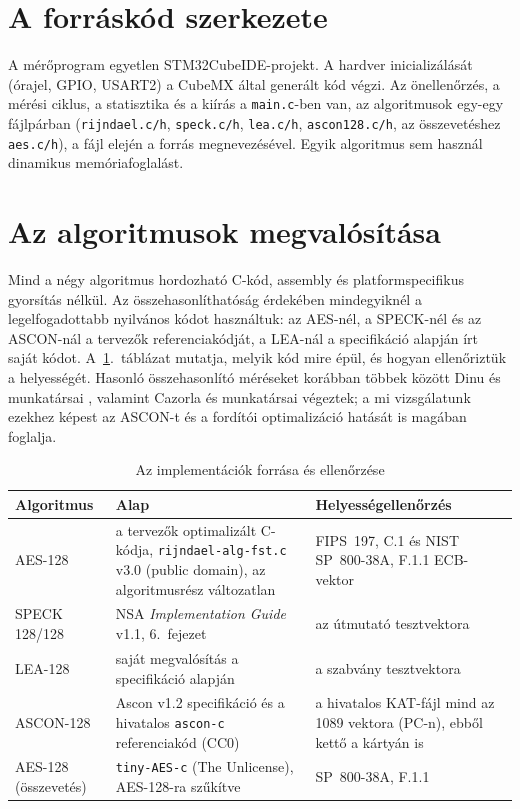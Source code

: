 \documentclass[a4paper,12pt]{report}
\theoremstyle{definition}
\theoremstyle{remark}
\begin{document}
\section{A forráskód szerkezete}

A mérőprogram egyetlen STM32CubeIDE-projekt. A hardver inicializálását (órajel, GPIO, USART2) a CubeMX által generált kód végzi. Az önellenőrzés, a mérési ciklus, a statisztika és a kiírás a \texttt{main.c}-ben van, az algoritmusok egy-egy fájlpárban (\texttt{rijndael.c/h}, \texttt{speck.c/h}, \texttt{lea.c/h}, \texttt{ascon128.c/h}, az összevetéshez \texttt{aes.c/h}), a fájl elején a forrás megnevezésével. Egyik algoritmus sem használ dinamikus memóriafoglalást.

\section{Az algoritmusok megvalósítása}\label{sec:megvalositas}

Mind a négy algoritmus hordozható C-kód, assembly és platformspecifikus gyorsítás nélkül. Az összehasonlíthatóság érdekében mindegyiknél a legelfogadottabb nyilvános kódot használtuk: az AES-nél, a SPECK-nél és az ASCON-nál a tervezők referenciakódját, a LEA-nál a specifikáció alapján írt saját kódot. A~\ref{tab:forrasok}.~táblázat mutatja, melyik kód mire épül, és hogyan ellenőriztük a helyességét. Hasonló összehasonlító méréseket korábban többek között Dinu és munkatársai \cite{Dinu2015}, valamint Cazorla és munkatársai \cite{Cazorla2013} végeztek; a mi vizsgálatunk ezekhez képest az ASCON-t és a fordítói optimalizáció hatását is magában foglalja.

\begin{table}[htbp]
    \centering
    \small
    \caption{Az implementációk forrása és ellenőrzése}
    \label{tab:forrasok}
    \begin{tabularx}{\textwidth}{|l|X|X|}
        \hline
        \textbf{Algoritmus} & \textbf{Alap} & \textbf{Helyességellenőrzés} \\ \hline
        AES-128 & a tervezők optimalizált C-kódja, \texttt{rijndael-alg-fst.c} v3.0 \cite{RijndaelFst} (public domain), az algoritmusrész változatlan & FIPS~197, C.1 \cite{FIPS197} és NIST SP~800-38A, F.1.1 ECB-vektor \cite{SP80038A} \\ \hline
        SPECK 128/128 & NSA \emph{Implementation Guide} v1.1, 6.~fejezet \cite{Beaulieu2019} & az útmutató tesztvektora \\ \hline
        LEA-128 & saját megvalósítás a specifikáció alapján \cite{Hong2013,Lee2014} & a szabvány tesztvektora \cite{KISALEA} \\ \hline
        ASCON-128 & Ascon v1.2 specifikáció \cite{Dobraunig2021} és a hivatalos \texttt{ascon-c} referenciakód \cite{AsconC} (CC0) & a hivatalos KAT-fájl mind az 1089 vektora (PC-n), ebből kettő a kártyán is \\ \hline
        AES-128 (összevetés) & \texttt{tiny-AES-c} \cite{TinyAES} (The Unlicense), AES-128-ra szűkítve & SP~800-38A, F.1.1 \\ \hline
    \end{tabularx}
\end{table}
\end{document}
